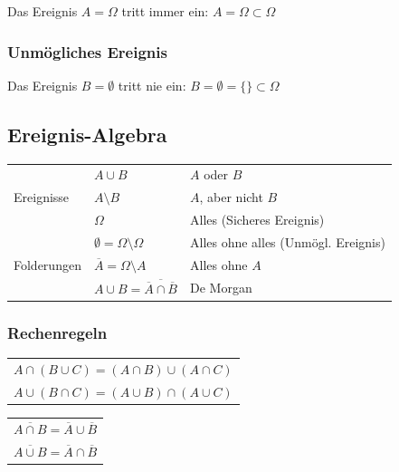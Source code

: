 Das Ereignis $A = \Omega$ tritt immer ein: $ A = \Omega \subset \Omega $


\subsubsection{Unmögliches Ereignis}

Das Ereignis $B = \emptyset$ tritt nie ein: $ B = \emptyset = \{ \} \subset \Omega $


\subsection{Ereignis-Algebra}

\renewcommand{\arraystretch}{1.4}
\begin{tabular}{|l | l | l |}
	\hline
				& $A \cup B$ 												& $A$ oder $B$ 							\\
	Ereignisse 	& $A \setminus B$ 											& $A$, aber nicht $B$ 					\\
				& $\Omega$ 													& Alles (Sicheres Ereignis) 			\\
	\hline
 				& $\emptyset = \Omega \setminus \Omega$ 					& Alles ohne alles (Unmögl. Ereignis) 	\\

	Folderungen & $\overline{A} = \Omega \setminus A$ 						& Alles ohne $A$						\\

				& $A \cup B = \overline{\overline{A} \cap \overline{B}}$ 	& De Morgan 							\\
	\hline
\end{tabular}
\renewcommand{\arraystretch}{1}


\subsubsection{Rechenregeln}

\begin{minipage}[t]{0.48\columnwidth}
	\renewcommand{\arraystretch}{1.2}
	\begin{tabular}{l}
		$A \cap (B \cup C) = ( A \cap B) \cup ( A \cap C )$ 	\\
		$A \cup (B \cap C) = (A \cup B) \cap ( A \cup C )$ 
	\end{tabular}
	\renewcommand{\arraystretch}{1}
\end{minipage}
\hfill
\begin{minipage}[t]{0.48\columnwidth}
	\renewcommand{\arraystretch}{1.2}
	\begin{tabular}{l}
		$\overline{A \cap B} = \overline{A} \cup \overline{B}$ \\
		$\overline{A \cup B} = \overline{A} \cap \overline{B}$ 
	\end{tabular}
	\renewcommand{\arraystretch}{1}
\end{minipage}


